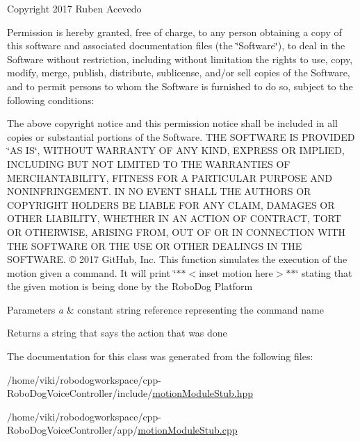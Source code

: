 Copyright 2017 Ruben Acevedo

Permission is hereby granted, free of charge, to any person obtaining a copy of this software and associated documentation files (the \char`\"{}\+Software\char`\"{}), to deal in the Software without restriction, including without limitation the rights to use, copy, modify, merge, publish, distribute, sublicense, and/or sell copies of the Software, and to permit persons to whom the Software is furnished to do so, subject to the following conditions\+:

The above copyright notice and this permission notice shall be included in all copies or substantial portions of the Software. T\+HE S\+O\+F\+T\+W\+A\+RE IS P\+R\+O\+V\+I\+D\+ED \char`\"{}\+A\+S I\+S\char`\"{}, W\+I\+T\+H\+O\+UT W\+A\+R\+R\+A\+N\+TY OF A\+NY K\+I\+ND, E\+X\+P\+R\+E\+SS OR I\+M\+P\+L\+I\+ED, I\+N\+C\+L\+U\+D\+I\+NG B\+UT N\+OT L\+I\+M\+I\+T\+ED TO T\+HE W\+A\+R\+R\+A\+N\+T\+I\+ES OF M\+E\+R\+C\+H\+A\+N\+T\+A\+B\+I\+L\+I\+TY, F\+I\+T\+N\+E\+SS F\+OR A P\+A\+R\+T\+I\+C\+U\+L\+AR P\+U\+R\+P\+O\+SE A\+ND N\+O\+N\+I\+N\+F\+R\+I\+N\+G\+E\+M\+E\+NT. IN NO E\+V\+E\+NT S\+H\+A\+LL T\+HE A\+U\+T\+H\+O\+RS OR C\+O\+P\+Y\+R\+I\+G\+HT H\+O\+L\+D\+E\+RS BE L\+I\+A\+B\+LE F\+OR A\+NY C\+L\+A\+IM, D\+A\+M\+A\+G\+ES OR O\+T\+H\+ER L\+I\+A\+B\+I\+L\+I\+TY, W\+H\+E\+T\+H\+ER IN AN A\+C\+T\+I\+ON OF C\+O\+N\+T\+R\+A\+CT, T\+O\+RT OR O\+T\+H\+E\+R\+W\+I\+SE, A\+R\+I\+S\+I\+NG F\+R\+OM, O\+UT OF OR IN C\+O\+N\+N\+E\+C\+T\+I\+ON W\+I\+TH T\+HE S\+O\+F\+T\+W\+A\+RE OR T\+HE U\+SE OR O\+T\+H\+ER D\+E\+A\+L\+I\+N\+GS IN T\+HE S\+O\+F\+T\+W\+A\+RE. © 2017 Git\+Hub, Inc. This function simulates the execution of the motion given a command. It will print \char`\"{}$\ast$$\ast$$<$inset motion here$>$$\ast$$\ast$\char`\"{} stating that the given motion is being done by the Robo\+Dog Platform 
\begin{DoxyParams}{Parameters}
{\em a} & constant string reference representing the command name \\
\hline
\end{DoxyParams}
\begin{DoxyReturn}{Returns}
a string that says the action that was done 
\end{DoxyReturn}


The documentation for this class was generated from the following files\+:\begin{DoxyCompactItemize}
\item 
/home/viki/robodogworkspace/cpp-\/\+Robo\+Dog\+Voice\+Controller/include/\hyperlink{motionModuleStub_8hpp}{motion\+Module\+Stub.\+hpp}\item 
/home/viki/robodogworkspace/cpp-\/\+Robo\+Dog\+Voice\+Controller/app/\hyperlink{motionModuleStub_8cpp}{motion\+Module\+Stub.\+cpp}\end{DoxyCompactItemize}
